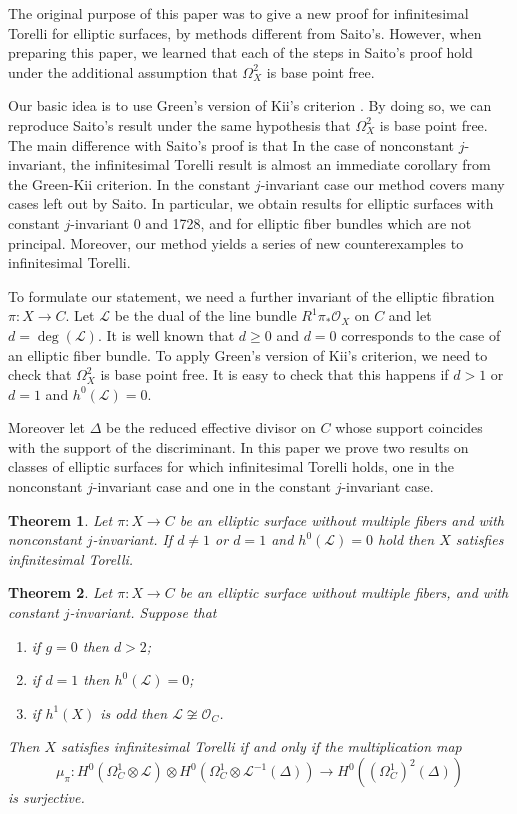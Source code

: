 \documentclass{amsart}
\newcommand{\cL}{\mathcal{L}}
\newcommand{\cO}{\mathcal{O}}
\newtheorem{theorem}{Theorem}[section]
\theoremstyle{definition}
\theoremstyle{remark}
\begin{document}
 The original purpose of this paper was to give a new proof for infinitesimal Torelli for elliptic surfaces, by methods different from Saito's.  However, when preparing this paper, we learned that each of the steps in Saito's proof hold  under the additional  assumption that $\Omega^2_X$ is base point free.
 
 Our basic idea is to use Green's version of Kii's criterion \cite[Corollary 4.d.3]{GreenKos}. By doing so, we can reproduce Saito's result under the same hypothesis that $\Omega^2_X$ is base point free. The main difference with Saito's proof is that In the case of nonconstant $j$-invariant, the infinitesimal Torelli result is almost an immediate corollary from the Green-Kii criterion. In the constant $j$-invariant case our method covers many cases left out by Saito. In particular, we obtain results for elliptic surfaces with constant $j$-invariant 0 and 1728, and for elliptic fiber bundles which are not principal.
Moreover, our method yields a series of new counterexamples to infinitesimal Torelli.
 
 
 
To formulate our statement, we need a further invariant of the elliptic fibration $\pi:X\to C$.  Let $\cL$ be the dual of the line bundle $R^1\pi_*\cO_X$ on $C$ and let $d=\deg(\cL)$. It is well known that $d\geq 0$ and $d=0$ corresponds to the case of an elliptic fiber bundle. To apply  Green's version of  Kii's criterion, we need to check that $\Omega^2_X$ is base point free. It is easy to check that this happens  if $d>1$ or $d=1$ and $h^0(\cL)=0$.

 Moreover let $\Delta$ be the reduced effective divisor on $C$ whose support coincides with the support of the discriminant.
In this paper we prove two  results on classes of elliptic surfaces for which infinitesimal Torelli holds, one in the nonconstant $j$-invariant case and one in  the constant $j$-invariant case.
\begin{theorem} Let $\pi: X\to C$ be an elliptic surface without multiple fibers and with nonconstant $j$-invariant. If $d\neq 1$ or $d=1$ and $h^0(\cL)=0$ hold then $X$ satisfies infinitesimal Torelli.
\end{theorem}

\begin{theorem} Let $\pi: X\to C$ be an elliptic surface without multiple fibers, and with constant $j$-invariant. Suppose that 
\begin{enumerate}
\item if $g=0$ then $d>2$;
\item if $d=1$ then $h^0(\cL)=0$;
\item if $h^1(X)$ is odd then $\cL\not \cong \cO_C$.
\end{enumerate}
Then $X$ satisfies infinitesimal Torelli \emph{if and only if} the multiplication map
\[ \mu_\pi: H^0(\Omega^1_C\otimes \cL)\otimes H^0(\Omega^1_C\otimes \cL^{-1}(\Delta)) \to H^0((\Omega^1_C)^2 (\Delta))\]
is surjective.
\end{theorem}
\end{document}
